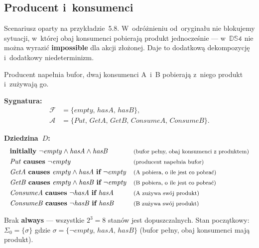 \documentclass[11pt,a4paper]{article}
\newif\ifshowbib
\newcommand{\bibonly}[1]{\ifshowbib#1\fi}
\renewcommand{\cite}[2][]{\unskip}%
\newcommand{\causes}{\textbf{causes}}
\renewcommand{\iff}{\textbf{if}}
\newcommand{\initially}{\textbf{initially}}
\newcommand{\always}{\textbf{always}}
\newcommand{\impossible}{\textbf{impossible}}
\newcommand{\cmt}[1]{\text{\footnotesize\normalfont (#1)}}
\theoremstyle{definition}
\begin{document}
\subsection{Producent i~konsumenci}
\label{sec:ex-producent}

\noindent Scenariusz oparty na przykładzie~5.8\bibonly{ z~\cite{rw05}}.
W~odróżnieniu od~oryginału nie blokujemy sytuacji, w~której obaj
konsumenci pobierają produkt jednocześnie --- w~$\mathbb{DS4}$
nie można wyrazić \impossible{} dla akcji złożonej.
Daje to dodatkową dekompozycję i~dodatkowy niedeterminizm.

Producent napełnia bufor, dwaj konsumenci A~i~B pobierają z~niego
produkt i~zużywają go.

\medskip
\noindent\textbf{Sygnatura:}
\begin{align*}
  \mathcal{F} &= \{\mathit{empty},\, \mathit{hasA},\, \mathit{hasB}\}, \\
  \mathcal{A} &= \{\mathit{Put},\, \mathit{GetA},\, \mathit{GetB},\,
                   \mathit{ConsumeA},\, \mathit{ConsumeB}\}.
\end{align*}

\medskip
\noindent\textbf{Dziedzina~$D$:}
{\small
\begin{align*}
  &\initially\ \neg\mathit{empty} \land \mathit{hasA} \land \mathit{hasB}
    && \cmt{bufor pełny, obaj konsumenci z~produktem} \\
  &\mathit{Put}\ \causes\ \neg\mathit{empty}
    && \cmt{producent napełnia bufor} \\
  &\mathit{GetA}\ \causes\ \mathit{empty} \land \mathit{hasA}\ \iff\ \neg\mathit{empty}
    && \cmt{A~pobiera, o~ile jest co pobrać} \\
  &\mathit{GetB}\ \causes\ \mathit{empty} \land \mathit{hasB}\ \iff\ \neg\mathit{empty}
    && \cmt{B~pobiera, o~ile jest co pobrać} \\
  &\mathit{ConsumeA}\ \causes\ \neg\mathit{hasA}\ \iff\ \mathit{hasA}
    && \cmt{A~zużywa swój produkt} \\
  &\mathit{ConsumeB}\ \causes\ \neg\mathit{hasB}\ \iff\ \mathit{hasB}
    && \cmt{B~zużywa swój produkt}
\end{align*}
}

Brak \always{} --- wszystkie $2^3 = 8$ stanów jest dopuszczalnych.
Stan początkowy: $\Sigma_0 = \{\sigma\}$ gdzie
$\sigma = \{\neg\mathit{empty},\, \mathit{hasA},\, \mathit{hasB}\}$
(bufor pełny, obaj konsumenci mają produkt).
\end{document}
